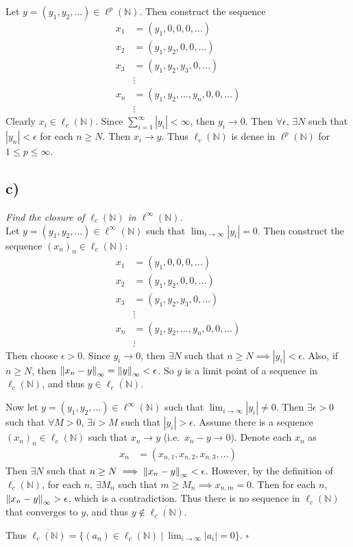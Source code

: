 \documentclass[12pt]{article}
\theoremstyle{plain}
\begin{document}
Let $y = (y_1, y_2, \dots) \in \ell^p(\mathbb{N})$.  Then construct the sequence
\begin{align*}
    x_1 &= (y_1, 0, 0, 0, \dots) \\
    x_2 &= (y_1, y_2, 0, 0, \dots) \\
    x_3 &= (y_1, y_2, y_3, 0, \dots) \\
    &\vdots \\
    x_n &= (y_1, y_2, \dots, y_n, 0, 0, \dots) \\
    &\vdots
\end{align*}
Clearly $x_i \in \ell_c(\mathbb{N})$.  Since $\sum_{i=1}^\infty |y_i| < \infty$, then $y_i \rightarrow 0$.  Then $\forall \epsilon$, $\exists N$ such that $|y_n| < \epsilon$ for each $n \geq N$.  Then $x_i \rightarrow y$.  Thus $\ell_c(\mathbb{N})$ is dense in $\ell^p(\mathbb{N})$ for $1 \leq p \leq \infty$.

\subsection*{ c)}
\emph{Find the closure of $\ell_c(\mathbb{N})$ in $\ell^\infty(\mathbb{N})$.} \\

Let $y = (y_1, y_2, \dots) \in \ell^\infty(\mathbb{N})$ such that $\lim_{i\rightarrow\infty}|y_i| = 0$.  Then construct the sequence $(x_n)_n \in \ell_c(\mathbb{N})$:
\begin{align*}
    x_1 &= (y_1, 0, 0, 0, \dots) \\
    x_2 &= (y_1, y_2, 0, 0, \dots) \\
    x_3 &= (y_1, y_2, y_3, 0, \dots) \\
    &\vdots \\
    x_n &= (y_1, y_2, \dots, y_n, 0, 0, \dots) \\
    &\vdots
\end{align*}
Then choose $\epsilon > 0$.  Since $y_i \rightarrow 0$, then $\exists N$ such that $n \geq N \implies |y_i| < \epsilon$.  Also, if $n \geq N$, then $\norm{x_n - y}_\infty = \norm{y}_\infty < \epsilon$.  So $y$ is a limit point of a sequence in $\ell_c(\mathbb{N})$, and thus $y \in \overline{\ell_c(\mathbb{N})}$.

Now let $y = (y_1, y_2, \dots) \in \ell^\infty(\mathbb{N})$ such that $\lim_{i\rightarrow\infty}|y_i| \neq 0$.  Then $\exists \epsilon > 0$ such that $\forall M > 0$, $\exists i > M$ such that $|y_i| > \epsilon$.  Assume there is a sequence $(x_n)_n \in \ell_c(\mathbb{N})$ such that $x_n \rightarrow y$ (i.e.~$x_n - y\rightarrow 0$).  Denote each $x_n$ as
\begin{align*}
    x_n &= (x_{n,1}, x_{n,2}, x_{n,3}, \dots)
\end{align*}
Then $\exists N$ such that $n \geq N \implies \norm{x_n - y}_\infty < \epsilon$.  However, by the definition of $\ell_c(\mathbb{N})$, for each $n$, $\exists M_n$ such that $m \geq M_n \implies x_{n,m} = 0$.  Then for each $n$, $\norm{x_n - y}_\infty > \epsilon$, which is a contradiction.  Thus there is no sequence in $\ell_c(\mathbb{N})$ that converges to $y$, and thus $y \not\in \overline{\ell_c(\mathbb{N})}$.

Thus $\overline{\ell_c(\mathbb{N})} = \{(a_n) \in \ell_c(\mathbb{N})\ |\ \lim_{i\rightarrow\infty}|a_i| = 0 \}$. \hfill $\square$
\end{document}
